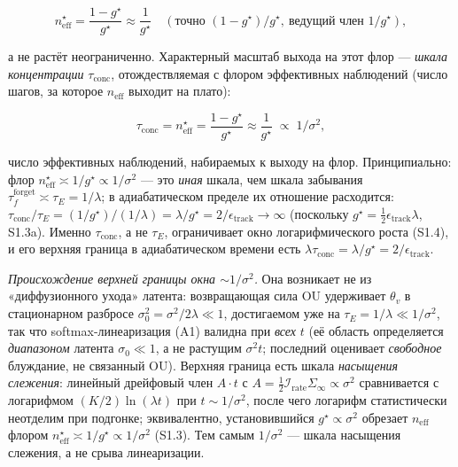 \documentclass[12pt]{iopart}
\begin{document}
\begin{equation}n_{\text{eff}}^\star = \frac{1-g^\star}{g^\star} \approx \frac{1}{g^\star} \quad (\text{точно } (1-g^\star)/g^\star,\ \text{ведущий член } 1/g^\star), \tag{S1.3b}\end{equation}



а не растёт неограниченно. Характерный масштаб выхода на этот флор --- \emph{шкала концентрации} \(\tau_{\text{conc}}\), отождествляемая с флором эффективных наблюдений (число шагов, за которое \(n_{\text{eff}}\) выходит на плато):



\begin{equation}\tau_{\text{conc}} = n_{\text{eff}}^\star = \frac{1-g^\star}{g^\star} \approx \frac{1}{g^\star} \;\propto\; 1/\sigma^2, \tag{S1.3c}\end{equation}



число эффективных наблюдений, набираемых к выходу на флор. Принципиально: флор \(n_{\text{eff}}^\star \asymp 1/g^\star \propto 1/\sigma^2\) --- это \emph{иная} шкала, чем шкала забывания \(\tau_f^{\text{forget}} \asymp \tau_E = 1/\lambda\); в адиабатическом пределе их отношение расходится: \(\tau_{\text{conc}}/\tau_E = (1/g^\star)/(1/\lambda) = \lambda/g^\star = 2/\epsilon_{\text{track}} \to \infty\) (поскольку \(g^\star = \tfrac12\epsilon_{\text{track}}\lambda\), S1.3a). Именно \(\tau_{\text{conc}}\), а не \(\tau_E\), ограничивает окно логарифмического роста (S1.4), и его верхняя граница в адиабатическом времени есть \(\lambda\tau_{\text{conc}} = \lambda/g^\star = 2/\epsilon_{\text{track}}\).



\emph{Происхождение верхней границы окна \(\sim 1/\sigma^2\).} Она возникает не из «диффузионного ухода» латента: возвращающая сила OU удерживает \(\theta_v\) в стационарном разбросе \(\sigma_0^2 = \sigma^2/2\lambda \ll 1\), достигаемом уже на \(\tau_E = 1/\lambda \ll 1/\sigma^2\), так что softmax-линеаризация (A1) валидна при \emph{всех} \(t\) (её область определяется \emph{диапазоном} латента \(\sigma_0 \ll 1\), а не растущим \(\sigma^2 t\); последний оценивает \emph{свободное} блуждание, не связанный OU). Верхняя граница есть шкала \emph{насыщения слежения}: линейный дрейфовый член \(A\cdot t\) с \(A = \tfrac12\mathcal I_{\text{rate}}\Sigma_\infty \propto \sigma^2\) сравнивается с логарифмом \((K/2)\ln(\lambda t)\) при \(t \sim 1/\sigma^2\), после чего логарифм статистически неотделим при подгонке; эквивалентно, установившийся \(g^\star \propto \sigma^2\) обрезает \(n_{\text{eff}}\) флором \(n_{\text{eff}}^\star \asymp 1/g^\star \propto 1/\sigma^2\) (S1.3). Тем самым \(1/\sigma^2\) --- шкала насыщения слежения, а не срыва линеаризации.
\end{document}
